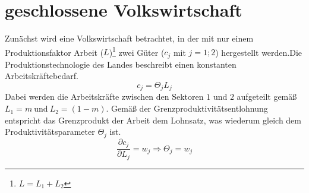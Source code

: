 \section{geschlossene Volkswirtschaft}
Zun{\"a}chst wird eine Volkswirtschaft betrachtet, in der mit nur einem Produktionsfaktor Arbeit ($L$)\footnote{$L= L_{1}+L_{2}$} zwei Güter ($c_j$ mit $j=1; 2$) hergestellt werden.\newline Die Produktionstechnologie des Landes beschreibt einen konstanten Arbeitskräftebedarf.
\begin{equation} c_j=\Theta_jL_j \end{equation}
Dabei werden die Arbeitskräfte zwischen den Sektoren $1$ und $2$ aufgeteilt gemäß 
$L_1=m ~\text{und}~L_2=(1-m)$. Gem{\"a}{\ss} der Grenzproduktivit{\"a}tsentlohnung entspricht das Grenzprodukt der Arbeit dem Lohnsatz, was wiederum gleich dem Produktivit{\"a}tsparameter $\Theta_j$ ist. 
\begin{displaymath} \frac{\partial c_j}{\partial L_j}=w_j \Rightarrow \Theta_j=w_j\end{displaymath}

